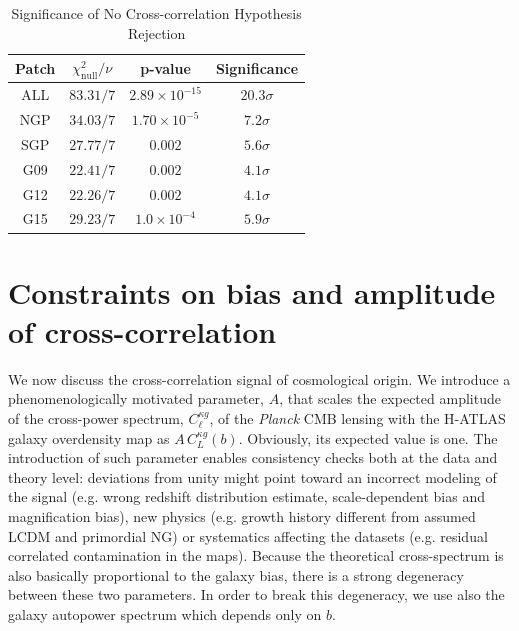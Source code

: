 \begin{table}[t]
\centering
\begin{tabular}{cccc}
\toprule
\midrule
Patch & $\chi_{\text{null}}^2 / \nu$ & p-value & Significance\\
\midrule
ALL   &   $83.31/7 $&    $2.89 \times 10^{-15}  $ &    $20.3 \sigma$  \\
NGP  &   $34.03/7 $&    $1.70 \times 10^{-5}    $ &    $7.2 \sigma $ \\
SGP  &   $27.77/7 $&    $0.002                            $&    $5.6 \sigma $  \\
G09   &   $22.41/7 $&    $0.002                          $ &     $4.1 \sigma $ \\
G12   &   $22.26/7 $&    $0.002                           $ &   $4.1\sigma $  \\
G15   &   $29.23/7 $&    $1.0 \times 10^{-4}    $ &    $5.9 \sigma $ \\
\bottomrule
\end{tabular}
\caption{Significance of No Cross-correlation Hypothesis Rejection}
\label{kg_sigma}
\end{table}


\section{Constraints on bias and amplitude of cross-correlation}
\label{sec:constraintsxc1}

We now discuss the cross-correlation signal of cosmological origin. We introduce a phenomenologically motivated parameter, $A$, that scales the expected amplitude of the cross-power spectrum, $C^{\kappa g}_{\ell}$, of the \emph{Planck} \gls{CMB} lensing with the H-ATLAS galaxy overdensity map as $A\, C^{\kappa g}_L(b)$. Obviously, its expected value is one. The introduction of such parameter enables consistency checks both at the data and theory level: deviations from unity might point toward an incorrect modeling of the signal (e.g. wrong redshift distribution estimate, scale-dependent bias and magnification bias), new physics (e.g. growth history different from assumed \gls{LCDM} and primordial NG) or systematics affecting the datasets (e.g. residual correlated contamination in the maps). Because the theoretical cross-spectrum is also basically proportional to the galaxy bias, there is a strong degeneracy between these two parameters. In order to break this degeneracy, we use also the galaxy autopower spectrum which depends only on $b$. 

